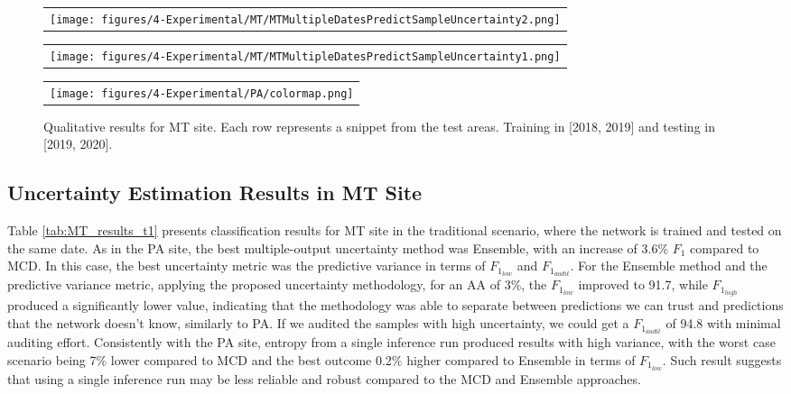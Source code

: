 \begin{figure*}[ht!]
  \centering
  \begin{tabular}{@{}c@{}}
    \texttt{[image: figures/4-Experimental/MT/MTMultipleDatesPredictSampleUncertainty2.png]} \\[\abovecaptionskip]
  \end{tabular}

  \vspace*{-0.5\baselineskip}
  \begin{tabular}{@{}c@{}}
    \texttt{[image: figures/4-Experimental/MT/MTMultipleDatesPredictSampleUncertainty1.png]} \\[\abovecaptionskip]
  \end{tabular}
  \vspace*{-0.5\baselineskip}
  
  \begin{tabular}{@{}c@{}}
    \texttt{[image: figures/4-Experimental/PA/colormap.png]} \\[\abovecaptionskip]
  \end{tabular}
  \caption{Qualitative results for MT site. Each row represents a snippet from the test areas. Training in [2018, 2019] and testing in [2019, 2020].}\label{fig:MTqualitative}
\end{figure*}


\subsection{Uncertainty Estimation Results in MT Site}\label{sec:results_uncertainty_MT}

Table \ref{tab:MT_results_t1} presents classification results for MT site in the traditional scenario, where the network is trained and tested on the same date. As in the PA site, the best multiple-output uncertainty method was Ensemble, with an increase of 3.6\% $F_1$ compared to MCD. In this case, the best uncertainty metric was the predictive variance in terms of $F_{1_{low}}$ and $F_{1_{audit}}$.  For the Ensemble method and the predictive variance metric, applying the proposed uncertainty methodology, for an AA of 3\%, the $F_{1_{low}}$ improved to 91.7, while $F_{1_{high}}$ produced a significantly lower value, indicating that the methodology was able to separate between predictions we can trust and predictions that the network doesn't know, similarly to PA. If we audited the samples with high uncertainty, we could get a $F_{1_{audit}}$ of 94.8 with minimal auditing effort. Consistently with the PA site, entropy from a single inference run produced results with high variance, with the worst case scenario being 7\% lower compared to MCD and the best outcome 0.2\% higher compared to Ensemble in terms of $F_{1_{low}}$. Such result suggests that using a single inference run may be less reliable and robust compared to the MCD and Ensemble approaches.


